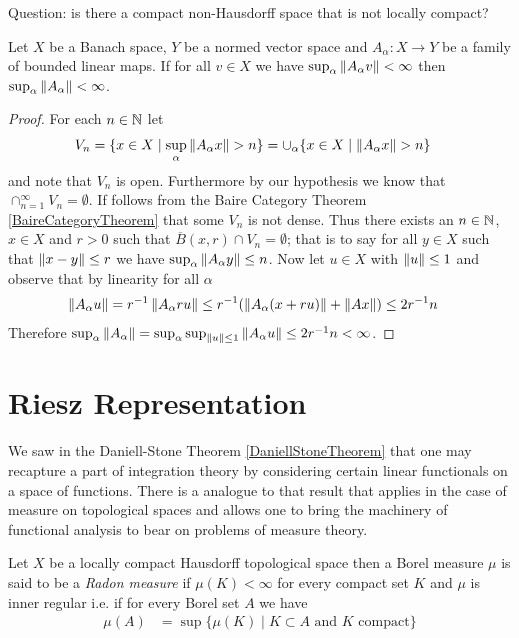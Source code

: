 Question: is there a compact non-Hausdorff space that is not locally compact?

\begin{thm}\label{PrincipleOfUniformBoundedness}Let $X$ be a Banach space, $Y$ be a normed vector space and
  $A_\alpha : X \to Y$ be a family of bounded linear maps.  If for all
  $v \in X$ we have $\sup_\alpha \left \lVert A_\alpha v \right \rVert <\infty$ then
  $\sup_\alpha \left \lVert A_\alpha \right \rVert < \infty$.
\end{thm}
\begin{proof}
For each $n \in \mathbb{N}$ let 
\begin{align*}
V_n &= \lbrace x \in X \mid \sup_\alpha
\left \lVert A_\alpha x \right \rVert > n \rbrace
= \cup_\alpha \lbrace x \in X \mid \left \lVert A_\alpha x \right \rVert > n \rbrace
\end{align*}
 and note that $V_n$ is open.
Furthermore by our hypothesis we know that $\cap_{n=1}^\infty V_n =
\emptyset$.  If follows from the Baire Category Theorem
\ref{BaireCategoryTheorem} that some $V_n$ is not dense.  Thus there
exists an $n \in \mathbb{N}$, $x \in X$ and $r > 0$ such that
$\overline{B}(x,r) \cap V_n = \emptyset$; that is to say for all $y
\in X$ such that $\left \lVert x-y \right \rVert \leq r$ we have $\sup_\alpha
\left \lVert A_\alpha y \right \rVert \leq n$.  
Now let $u \in X$ with
$\left \lVert u \right \rVert \leq 1$ and observe that by linearity for all $\alpha$ 
\begin{align*} 
\left \lVert A_\alpha u \right \rVert &=
r^{-1} \left \lVert A_\alpha ru \right \rVert  \leq r^{-1}( \left \lVert A_\alpha (x + ru)  \right \rVert +
                    \left \lVert A x \right \rVert) \leq 2 r^{-1} n
\end{align*}
Therefore $\sup_\alpha \left \lVert A_\alpha \right \rVert = \sup_\alpha \sup_{\left \lVert u \right \rVert
  \leq 1} \left \lVert A_\alpha u \right \rVert  \leq 2 r^{-1} n < \infty$.
\end{proof}

\section{Riesz Representation}

We saw in the Daniell-Stone Theorem \ref{DaniellStoneTheorem} that one
may recapture a part of integration theory by considering certain
linear functionals on a space of functions.  There is a analogue to
that result that applies in the case of measure on topological
spaces and allows one to bring the machinery of functional analysis to
bear on problems of measure theory.  

\begin{defn}Let $X$ be a locally compact Hausdorff topological space then a Borel measure $\mu$ is said to be a
\emph{Radon measure} if $\mu(K) < \infty$ for every compact set $K$ and $\mu$ is inner regular i.e. if for every Borel set $A$ we
have 
\begin{align*}
\mu(A) &= \sup \lbrace \mu(K) \mid K \subset A \text{ and $K$ compact} \rbrace
\end{align*}
\end{defn}

